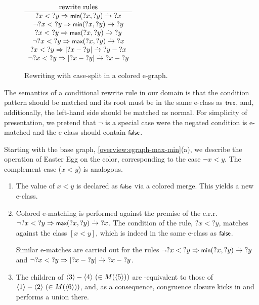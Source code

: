 \begin{example}
\begin{figure}[t]
\begin{center}
\begin{tabular}{L{4.5cm}l@{}}
\end{tabular}
%    
\\
$\begin{array}{c}
        \mbox{rewrite rules} \\ \arrayrulecolor{gray!50!white}\hline
        {?x} < {?y} \Rightarrow \tmin({?x}, {?y}) \rwto {?x} \\
        \lnot{?x} < {?y} \Rightarrow \tmin({?x}, {?y}) \rwto {?y} \\
        {?x} < {?y} \Rightarrow \tmax({?x}, {?y}) \rwto {?y} \\
        \lnot{?x} < {?y} \Rightarrow \tmax({?x}, {?y}) \rwto {?x} \\
        {?x} < {?y} \Rightarrow |{?x} - {?y}| \rwto {?y} - {?x} \\
        \lnot{?x} < {?y} \Rightarrow |{?x} - {?y}| \rwto {?x} - {?y} \\
\end{array}$
\caption{\label{overview:colored:example}
    Rewriting with case-split in a colored e-graph.}

\end{center}
\end{figure}

The semantics of a conditional rewrite rule in our domain is that the condition pattern should be matched and its root must be in the same e-class as $\ttrue$, and, additionally, the left-hand side should be matched as normal.
For simplicity of presentation, we pretend that $\lnot$ is a special case were the negated condition is e-matched and the e-class should contain $\tfalse$.

\smallskip
Starting with the base graph, \autoref{overview:egraph-max-min}(a), we describe the operation of Easter Egg
on the \cred color, corresponding to the case $\lnot x < y$.
The complement \cblue case ($x < y$) is analogous.

\begin{enumerate}[leftmargin=1.5em]
\item
    The value of $x < y$ is declared as $\tfalse$ via
    a colored merge.
    This yields a new \cred e-class.
\item
    Colored e-matching is performed against the premise of the c.r.r. $\lnot {?x} < {?y} \Rightarrow \tmax({?x}, {?y}) \rwto {?x}$.
    The condition of the rule, ${?x} < {?y}$, matches against the class $[x < y]$, 
    which is indeed in the same \cred e-class as $\tfalse$.
    
    Similar e-matches are carried out for the rules
    $\lnot {?x} < {?y} \Rightarrow \tmin({?x}, {?y}) \rwto {?y}$
    and
    $\lnot {?x} < {?y} \Rightarrow |{?x} - {?y}| \overset{.\,}{\rightarrow} {?x} - {?y}$.
\item
    The children of $\langle 3\rangle - \langle 4\rangle ~(\in M(\langle 5\rangle))$ are \cred-equivalent to those of $\langle 1\rangle - \langle 2\rangle ~(\in M(\langle 6\rangle))$, and,
    as a consequence, \cred congruence closure kicks in and performs a \cred union there.
\end{enumerate}


\end{example}
